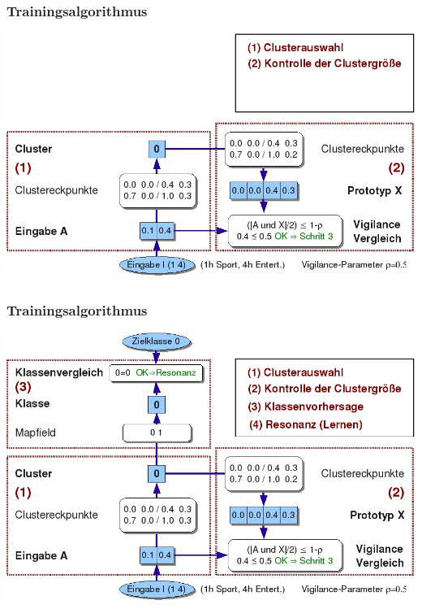 \documentclass[12pt]{beamer}
\begin{document}
\begin{frame}
	\frametitle{Trainingsalgorithmus}

   \addtocounter{framenumber}{-1}
	\textheight
	\begin{center}
		\includegraphics[height=0.9\textheight]{images/artmapBspStep2Ok}
	\end{center}
\end{frame}
\begin{frame}
	\frametitle{Trainingsalgorithmus}

   \addtocounter{framenumber}{-1}
	\textheight
	\begin{center}
		\includegraphics[height=0.95\textheight]{images/artmapBspStep3Ok}
	\end{center}
\end{frame}
%
\end{document}
